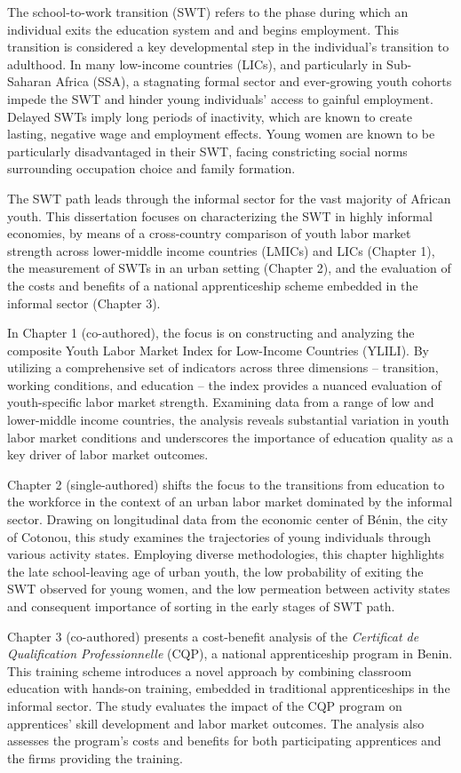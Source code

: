 The school-to-work transition (SWT) refers to the phase during which an individual exits the education system and and begins employment. This transition is considered a key developmental step in the individual's transition to adulthood. In many low-income countries (LICs), and particularly in Sub-Saharan Africa (SSA), a stagnating formal sector and ever-growing youth cohorts impede the SWT and hinder young individuals' access to gainful employment. Delayed SWTs imply long periods of inactivity, which are known to create lasting, negative wage and employment effects. Young women are known to be particularly disadvantaged in their SWT, facing constricting social norms surrounding occupation choice and family formation.

The SWT path leads through the informal sector for the vast majority of African youth. This dissertation focuses on characterizing the SWT in highly informal economies, by means of a cross-country comparison of youth labor market strength across lower-middle income countries (LMICs) and LICs (Chapter 1), the measurement of SWTs in an urban setting (Chapter 2), and the evaluation of the costs and benefits of a national apprenticeship scheme embedded in the informal sector (Chapter 3).

In Chapter 1 (co-authored), the focus is on constructing and analyzing the composite Youth Labor Market Index for Low-Income Countries (YLILI). By utilizing a comprehensive set of indicators across three dimensions -- transition, working conditions, and education -- the index provides a nuanced evaluation of youth-specific labor market strength. Examining data from a range of low and lower-middle income countries, the analysis reveals substantial variation in youth labor market conditions and underscores the importance of education quality as a key driver of labor market outcomes.

Chapter 2 (single-authored) shifts the focus to the transitions from education to the workforce in the context of an urban labor market dominated by the informal sector. Drawing on longitudinal data from the economic center of Bénin, the city of Cotonou, this study examines the trajectories of young individuals through various activity states. Employing diverse methodologies, this chapter highlights the late school-leaving age of urban youth, the low probability of exiting the SWT observed for young women, and the low permeation between activity states and consequent importance of sorting in the early stages of SWT path.

Chapter 3 (co-authored) presents a cost-benefit analysis of the \textit{Certificat de Qualification Professionnelle} (CQP), a national apprenticeship program in Benin. This training scheme introduces a novel approach by combining classroom education with hands-on training, embedded in traditional apprenticeships in the informal sector. The study evaluates the impact of the CQP program on apprentices' skill development and labor market outcomes. The analysis also assesses the program's costs and benefits for both participating apprentices and the firms providing the training.

